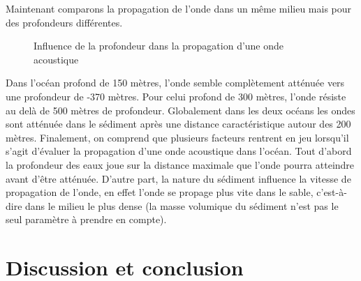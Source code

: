 \documentclass{rapportECC}
\begin{document}
Maintenant comparons la propagation de l'onde dans un même milieu mais pour des profondeurs différentes. 

\begin{figure}[H]
    \centering
    \label{fig:image1}\hfill
    \caption{Influence de la profondeur dans la propagation d'une onde acoustique}
    \label{fig:images_cote_a_cote}
\end{figure}
Dans l'océan profond de 150 mètres, l'onde semble complètement atténuée vers une profondeur de -370 mètres. Pour celui profond de 300 mètres, l'onde résiste au delà de 500 mètres de profondeur. Globalement dans les deux océans les ondes sont atténuée dans le sédiment après une distance caractéristique autour des 200 mètres. 
\vspace{1 cm}
Finalement, on comprend que plusieurs facteurs rentrent en jeu lorsqu'il s'agit d'évaluer la propagation d'une onde acoustique dans l'océan. Tout d'abord la profondeur des eaux joue sur la distance maximale que l'onde pourra atteindre avant d'être atténuée. D'autre part, la nature du sédiment influence la vitesse de propagation de l'onde, en effet l'onde se propage plus vite dans le sable, c'est-à-dire dans le milieu le plus dense (la masse volumique du sédiment n'est pas le seul paramètre à prendre en compte).
\section{Discussion et conclusion}
\end{document}
